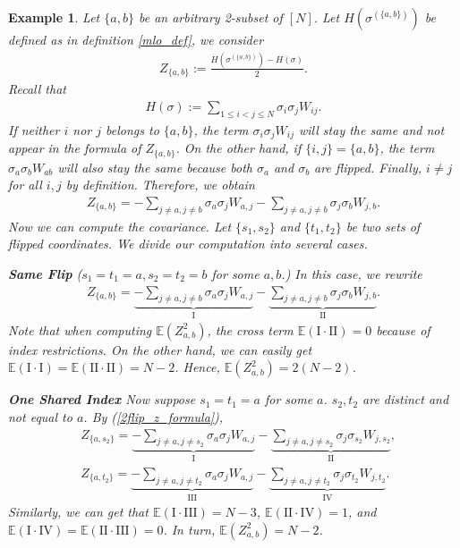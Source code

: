 \documentclass[10pt]{article}
\newcommand{\e}{\mathbb{E}}
\newtheorem{example}{\bf Example}
\newenvironment{Proof of lemma}{\noindent{\bf Proof of Lemma}}{\hfill$\Box$\newline}
\newenvironment{Proof of claim}{\noindent{\bf Proof of claim}}{\hfill$\Box$\newline}
\newenvironment{Proof of theorem}{\noindent{\bf Proof of Theorem}}{\hfill\scriptsize{$\Box$}\newline}
\newenvironment{Proof of theorems}{\noindent{\bf Proof of Theorems}}{\hfill$\Box$\newline}
\newenvironment{Proof of proposition}{\noindent{\bf Proof of Proposition}}{\hfill$\Box$\newline}
\newenvironment{Proof of propositions}{\noindent{\bf Proof of Propositions}}{\hfill$\Box$\newline}
\newenvironment{Proof of exercise}{\noindent{\it Proof of Exercise:}}{\hfill$\Box$}
\numberwithin{equation}{section}
\begin{document}
\begin{example} \label{2_flip_covar_example}
    Let $\{a,b\}$ be an arbitrary 2-subset of $[N]$. Let $H(\sigma^{(\{a,b\})})$ be defined as in definition \ref{mlo_def}, we consider 
    \begin{align}
        Z_{\{a,b\}}:=\frac{H(\sigma^{(\{a,b\})}) -H(\sigma)}{2}.
    \end{align}
    Recall that
    \begin{align}
        H(\sigma) := \sum_{1 \leq i < j \leq N} \sigma_i \sigma_j W_{ij}.
    \end{align}
    If neither $i$ nor $j$ belongs to $\{a,b\}$, the term $\sigma_i \sigma_j W_{ij}$ will stay the same and not appear in the formula of $Z_{\{a,b\}}$. On the other hand, if $\{i,j\} = \{a,b\}$, the term $\sigma_a \sigma_b W_{ab}$ will also stay the same because both $\sigma_a$ and $\sigma_b$ are flipped. Finally, $i \neq j$ for all $i,j$ by definition. Therefore, we obtain
    \begin{align} \label{2flip_z_formula}
        Z_{\{a,b\}} = - \sum_{j \neq a, j \neq b} \sigma_a \sigma_j W_{a,j} - \sum_{j \neq a, j \neq b} \sigma_j \sigma_b W_{j,b}.
    \end{align}
    Now we can compute the covariance. Let $\{s_1,s_2\}$ and $\{t_1,t_2\}$ be two sets of flipped coordinates. We divide our computation into several cases.

    \textbf{Same Flip} ($s_1 = t_1 = a, s_2 = t_2 =b $ for some $a,b$.) In this case, we rewrite
    \begin{align}
        Z_{\{a,b\}} = \underbrace{- \sum_{j \neq a, j \neq b} \sigma_a \sigma_j W_{a,j}}_\text{I} - \underbrace{\sum_{j \neq a, j \neq b} \sigma_j \sigma_b W_{j,b}}_\text{II}.
    \end{align}
    Note that when computing $\e(Z_{a,b}^2)$, the cross term $\e(\text{I}\cdot \text{II}) =0$ because of index restrictions. On the other hand, we can easily get $\e(\text{I} \cdot \text{I}) = \e(\text{II} \cdot \text{II}) = N-2$. Hence, $\e(Z_{a,b}^2) = 2(N-2)$.

    \textbf{One Shared Index} Now suppose $s_1=t_1=a$ for some $a$. $s_2,t_2$ are distinct and not equal to $a$. By (\ref{2flip_z_formula}),
    \begin{align}
        &Z_{\{a,s_2\}} = \underbrace{- \sum_{j \neq a, j \neq s_2} \sigma_a \sigma_j W_{a,j}}_\text{I} - \underbrace{\sum_{j \neq a, j \neq s_2} \sigma_j \sigma_{s_2} W_{j,s_2}}_\text{II}, \\
        &Z_{\{a,t_2\}} = \underbrace{- \sum_{j \neq a, j \neq t_2} \sigma_a \sigma_j W_{a,j}}_\text{III} - \underbrace{\sum_{j \neq a, j \neq t_2} \sigma_j \sigma_{t_2} W_{j,t_2}}_\text{IV}.
    \end{align}
    Similarly, we can get that $\e(\text{I} \cdot \text{III}) = N-3$, $\e(\text{II} \cdot \text{IV}) = 1$, and $\e(\text{I} \cdot \text{IV}) = \e(\text{II} \cdot \text{III}) = 0$. In turn, $\e(Z_{a,b}^2) = N-2$.


\end{example}
\end{document}
